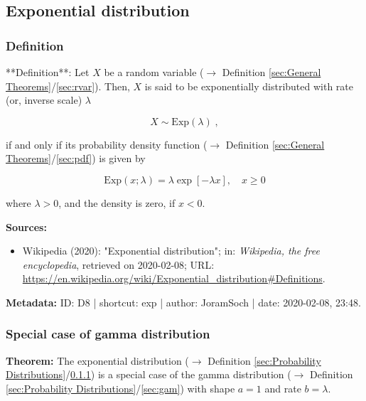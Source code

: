 \documentclass[a4paper,12pt,twoside]{book}
\begin{document}
\subsection{Exponential distribution}

\subsubsection[\textit{Definition}]{Definition} \label{sec:exp}
\setcounter{equation}{0}

**Definition**: Let $X$ be a random variable ($\rightarrow$ Definition \ref{sec:General Theorems}/\ref{sec:rvar}). Then, $X$ is said to be exponentially distributed with rate (or, inverse scale) $\lambda$

\begin{equation} \label{eq:exp-exp}
X \sim \mathrm{Exp}(\lambda) \; ,
\end{equation}

if and only if its probability density function ($\rightarrow$ Definition \ref{sec:General Theorems}/\ref{sec:pdf}) is given by

\begin{equation} \label{eq:exp-exp-pdf}
\mathrm{Exp}(x; \lambda) = \lambda \exp[-\lambda x], \quad x \geq 0
\end{equation}

where $\lambda > 0$, and the density is zero, if $x < 0$.


\vspace{1em}
\textbf{Sources:}
\begin{itemize}
\item Wikipedia (2020): "Exponential distribution"; in: \textit{Wikipedia, the free encyclopedia}, retrieved on 2020-02-08; URL: \url{https://en.wikipedia.org/wiki/Exponential_distribution#Definitions}.
\end{itemize}


\vspace{1em}
\textbf{Metadata:} ID: D8 | shortcut: exp | author: JoramSoch | date: 2020-02-08, 23:48.
\vspace{1em}



\subsubsection[\textbf{Special case of gamma distribution}]{Special case of gamma distribution} \label{sec:exp-gam}
\setcounter{equation}{0}

\textbf{Theorem:} The exponential distribution ($\rightarrow$ Definition \ref{sec:Probability Distributions}/\ref{sec:exp}) is a special case of the gamma distribution ($\rightarrow$ Definition \ref{sec:Probability Distributions}/\ref{sec:gam}) with shape $a = 1$ and rate $b = \lambda$.
\end{document}
